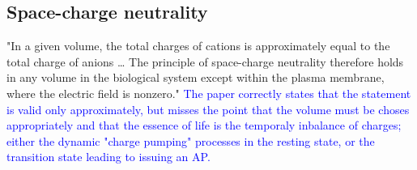 \subsection{Space-charge neutrality\label{sec:Physics-Neutrality}}
"In a given volume, the total charges of cations is approximately equal to
the total charge of anions \dots
The principle of space-charge neutrality therefore holds in any volume
in the biological system except within the plasma membrane, where the
electric field is nonzero."
\textcolor{blue}{The paper correctly states that the statement 
is valid only approximately, but misses the point that 
the volume must be choses appropriately and that the essence
of life is the temporaly inbalance of charges; either the 
dynamic "charge pumping" processes in the resting state,
or the transition state leading to issuing an \gls{AP}.}

